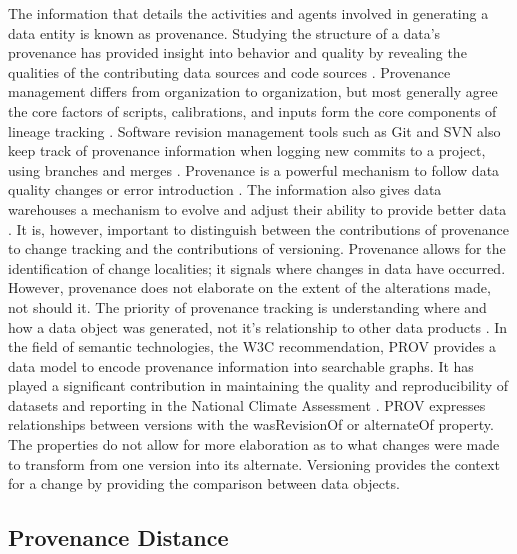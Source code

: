 The information that details the activities and agents involved in generating a data entity is known as provenance.
Studying the structure of a data's provenance has provided insight into behavior and quality by revealing the qualities of the contributing data sources and code sources \cite{dai2014provenance} \cite{Cavanaugh2002}.
Provenance management differs from organization to organization, but most generally agree the core factors of scripts, calibrations, and inputs form the core components of lineage tracking \cite{Barkstrom2003} \cite{Branco2008}.
Software revision management tools such as Git and SVN also keep track of provenance information when logging new commits to a project, using branches and merges  \cite{Chacon:2009:PG:1618548}.
Provenance is a powerful mechanism to follow data quality changes or error introduction .
The information also gives data warehouses a mechanism to evolve and adjust their ability to provide better data \cite{Vassiliadis1999}.
It is, however, important to distinguish between the contributions of provenance to change tracking and the contributions of versioning.
Provenance allows for the identification of change localities; it signals where changes in data have occurred.
However, provenance does not elaborate on the extent of the alterations made, not should it.
The priority of provenance tracking is understanding where and how a data object was generated, not it's relationship to other data products \cite{Bose:2005:LRS:1057977.1057978}.
In the field of semantic technologies, the W3C recommendation, PROV provides a data model to encode provenance information into searchable graphs.
It has played a significant contribution in maintaining the quality and reproducibility of datasets and reporting in the National Climate Assessment \cite{Tilmes2012,Ma2014191,Ma2014} \cite{Ma2014191} \cite{Ma2014}.
PROV expresses relationships between versions with the wasRevisionOf or alternateOf property.
The properties do not allow for more elaboration as to what changes were made to transform from one version into its alternate.
Versioning provides the context for a change by providing the comparison between data objects.

\subsection{Provenance Distance}

